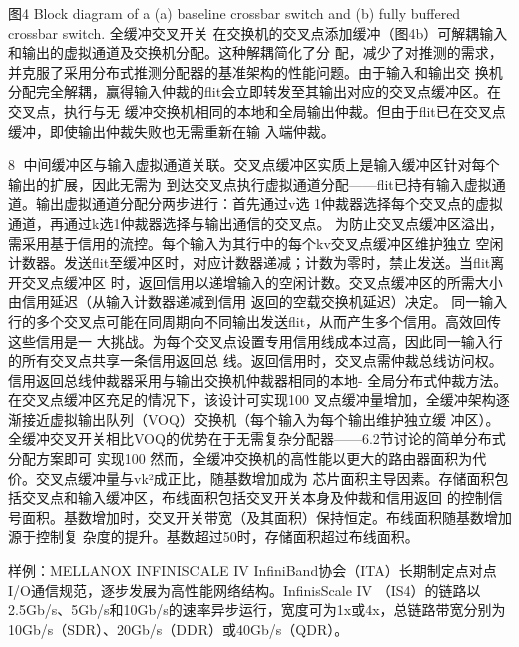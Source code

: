 图4 Block diagram of a (a) baseline crossbar switch and (b) fully buffered crossbar switch.
全缓冲交叉开关
在交换机的交叉点添加缓冲（图4b）可解耦输入和输出的虚拟通道及交换机分配。这种解耦简化了分
配，减少了对推测的需求，并克服了采用分布式推测分配器的基准架构的性能问题。由于输入和输出交
换机分配完全解耦，赢得输入仲裁的flit会立即转发至其输出对应的交叉点缓冲区。在交叉点，执行与无
缓冲交换机相同的本地和全局输出仲裁。但由于flit已在交叉点缓冲，即使输出仲裁失败也无需重新在输
入端仲裁。

                                                                                             8
中间缓冲区与输入虚拟通道关联。交叉点缓冲区实质上是输入缓冲区针对每个输出的扩展，因此无需为
到达交叉点执行虚拟通道分配——flit已持有输入虚拟通道。输出虚拟通道分配分两步进行：首先通过v选
1仲裁器选择每个交叉点的虚拟通道，再通过k选1仲裁器选择与输出通信的交叉点。
为防止交叉点缓冲区溢出，需采用基于信用的流控。每个输入为其行中的每个kv交叉点缓冲区维护独立
空闲计数器。发送flit至缓冲区时，对应计数器递减；计数为零时，禁止发送。当flit离开交叉点缓冲区
时，返回信用以递增输入的空闲计数。交叉点缓冲区的所需大小由信用延迟（从输入计数器递减到信用
返回的空载交换机延迟）决定。
同一输入行的多个交叉点可能在同周期向不同输出发送flit，从而产生多个信用。高效回传这些信用是一
大挑战。为每个交叉点设置专用信用线成本过高，因此同一输入行的所有交叉点共享一条信用返回总
线。返回信用时，交叉点需仲裁总线访问权。信用返回总线仲裁器采用与输出交换机仲裁器相同的本地-
全局分布式仲裁方法。
在交叉点缓冲区充足的情况下，该设计可实现100%
叉点缓冲量增加，全缓冲架构逐渐接近虚拟输出队列（VOQ）交换机（每个输入为每个输出维护独立缓
冲区）。全缓冲交叉开关相比VOQ的优势在于无需复杂分配器——6.2节讨论的简单分布式分配方案即可
实现100%
然而，全缓冲交换机的高性能以更大的路由器面积为代价。交叉点缓冲量与vk²成正比，随基数增加成为
芯片面积主导因素。存储面积包括交叉点和输入缓冲区，布线面积包括交叉开关本身及仲裁和信用返回
的控制信号面积。基数增加时，交叉开关带宽（及其面积）保持恒定。布线面积随基数增加源于控制复
杂度的提升。基数超过50时，存储面积超过布线面积。

样例：MELLANOX INFINISCALE IV
InfiniBand协会（ITA）长期制定点对点I/O通信规范，逐步发展为高性能网络结构。InfinisScale IV
（IS4）的链路以2.5Gb/s、5Gb/s和10Gb/s的速率异步运行，宽度可为1x或4x，总链路带宽分别为
10Gb/s（SDR）、20Gb/s（DDR）或40Gb/s（QDR）。




